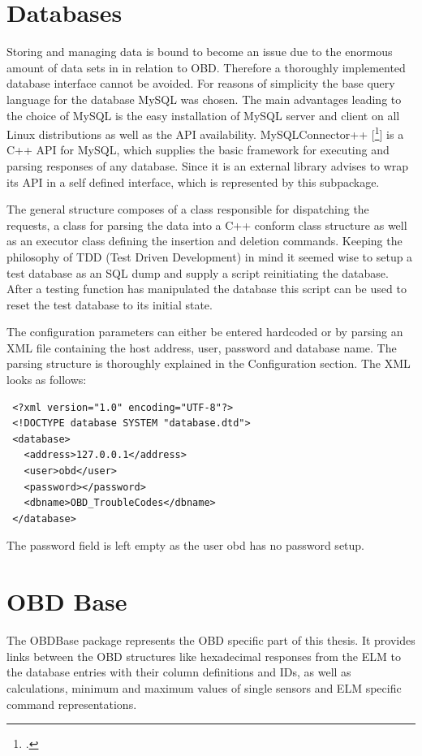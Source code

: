 
\section{Databases}
\label{sec:database}
Storing and managing data is bound to become an issue due to the enormous amount of data sets in in relation to OBD. Therefore a thoroughly 
implemented database interface cannot be avoided. For reasons of simplicity the base query language for the database MySQL was chosen. The main 
advantages leading to the choice of MySQL is the easy installation of MySQL server and client on all Linux distributions as well as the API 
availability. MySQLConnector++ [\footcite{MYSQL}] is a C++ API for MySQL, which supplies the basic framework for executing and parsing responses of any database. 
Since it is an external library   advises to wrap its API in a self defined interface, which is represented by this subpackage. 

The general structure composes of a class responsible for dispatching the requests, a class for parsing the data into a C++ conform class 
structure as well as an executor class defining the insertion and deletion commands. Keeping the philosophy of TDD (Test Driven Development) 
in mind it seemed wise to setup a test database as an SQL dump and supply a script reinitiating the database. After a testing function has 
manipulated the database this script can be used to reset the test database to its initial state. 

The configuration parameters can either be entered hardcoded or by parsing an XML file containing the host address, user, password and database 
name. The parsing  structure is thoroughly explained in the Configuration section. The XML looks as follows:

\begin{verbatim}
 <?xml version="1.0" encoding="UTF-8"?>
 <!DOCTYPE database SYSTEM "database.dtd">
 <database>
   <address>127.0.0.1</address>
   <user>obd</user>
   <password></password>
   <dbname>OBD_TroubleCodes</dbname>
 </database>
\end{verbatim}

The password field is left empty as the user obd has no password setup.  


\section{OBD Base}
\label{sec:obdbase}
The OBDBase package represents the OBD specific part of this thesis. It provides links between the OBD structures like hexadecimal responses 
from the ELM to the database entries with their column definitions and IDs, as well as calculations, minimum and maximum values of single 
sensors and ELM specific command representations.

